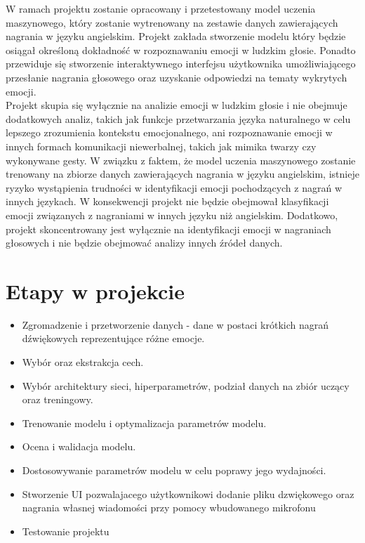 \documentclass[12pt,titlepage]{article}
\begin{document}
W ramach projektu zostanie opracowany i przetestowany model uczenia maszynowego, który zostanie wytrenowany na zestawie danych zawierających nagrania w języku angielskim. Projekt zakłada stworzenie modelu który będzie osiągał określoną dokładność w rozpoznawaniu emocji w ludzkim głosie. Ponadto przewiduje się stworzenie interaktywnego interfejsu użytkownika umożliwiającego przesłanie nagrania głosowego oraz uzyskanie odpowiedzi na tematy wykrytych emocji.\\

Projekt skupia się wyłącznie na analizie emocji w ludzkim głosie i nie obejmuje dodatkowych analiz, takich jak funkcje przetwarzania języka naturalnego w celu lepszego zrozumienia kontekstu emocjonalnego, ani rozpoznawanie emocji w innych formach komunikacji niewerbalnej, takich jak mimika twarzy czy wykonywane gesty. W związku z faktem, że model uczenia maszynowego zostanie trenowany na zbiorze danych zawierających nagrania w języku angielskim, istnieje ryzyko wystąpienia trudności w identyfikacji emocji pochodzących z nagrań w innych językach. W konsekwencji projekt nie będzie obejmował klasyfikacji emocji związanych z nagraniami w innych języku niż angielskim. Dodatkowo, projekt skoncentrowany jest wyłącznie na identyfikacji emocji w nagraniach głosowych i nie będzie obejmować analizy innych źródeł danych.

\section{Etapy w projekcie}
\begin{itemize}
    \item Zgromadzenie i przetworzenie danych - dane w postaci krótkich nagrań dźwiękowych reprezentujące różne emocje.
    \item Wybór oraz ekstrakcja cech.
    \item Wybór architektury sieci, hiperparametrów, podział danych na zbiór uczący oraz treningowy.
    \item Trenowanie modelu i optymalizacja parametrów modelu.
    \item Ocena i walidacja modelu.
    \item Dostosowywanie parametrów modelu w celu poprawy jego wydajności.
    \item Stworzenie UI pozwalajacego użytkownikowi dodanie pliku dzwiękowego oraz nagrania własnej wiadomości przy pomocy wbudowanego mikrofonu
    \item Testowanie projektu
\end{itemize}
\end{document}

